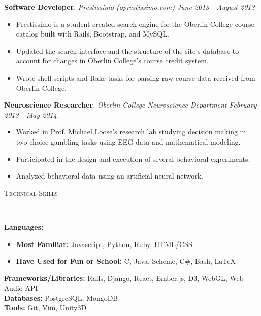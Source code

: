 \documentclass[9pt]{article}
\newenvironment{changemargin}[2]{%
  \begin{list}{}{%
    \setlength{\topsep}{0pt}%
    \setlength{\leftmargin}{#1}%
    \setlength{\rightmargin}{#2}%
    \setlength{\listparindent}{\parindent}%
    \setlength{\itemindent}{\parindent}%
    \setlength{\parsep}{\parskip}%
  }%
  \item[]}{\end{list}
}
\newcommand{\lineover}{
	\begin{changemargin}{-0.05in}{-0.05in}
		\vspace*{-8pt}
		\hrulefill \\
		\vspace*{-2pt}
	\end{changemargin}
}
\newcommand{\header}[1]{
	\begin{changemargin}{-0.5in}{-0.5in}
		\scshape{#1}\\
  	\lineover
	\end{changemargin}
}
\newenvironment{body} {
	\vspace*{-16pt}
	\begin{changemargin}{-0.25in}{-0.5in}
  }	
	{\end{changemargin}
}
\begin{document}
\begin{body}
	\textbf{Software Developer}, \emph{Prestissimo (oprestissimo.com)} \hfill \emph{June 2013 - August 2013}\\
	\vspace*{-4pt}
	\begin{itemize} \itemsep -0pt  %
		\item Prestissimo is a student-created search engine for the  Oberlin College course catalog built with Rails, Bootstrap, and MySQL.
		\item Updated the search interface and the structure of the site's database to account for changes in Oberlin College's course credit system.
		\item Wrote shell scripts and Rake tasks for parsing raw course data received from Oberlin College.
	\end{itemize}

	\textbf{Neuroscience Researcher}, \emph{Oberlin College Neuroscience Department} \hfill \emph{February 2013 - May 2014}\\
	\vspace*{-4pt}
	\begin{itemize} \itemsep -0pt  %
		\item Worked in Prof. Michael Loose's research lab studying decision making in two-choice gambling tasks using EEG data and mathematical modeling.
		\item Participated in the design and execution of several behavioral experiments.
		\item Analyzed behavioral data using an artificial neural network.
	\end{itemize}
\end{body}

\smallskip

\header{Technical Skills}

\begin{body}
	\vspace{14pt}
	\textbf{Languages:}{} 
		\begin{itemize} \itemsep -0pt  %
			\item \textbf{Most Familiar:} Javascript, Python, Ruby, HTML/CSS
			\item \textbf{Have Used for Fun or School:} C, Java, Scheme, C\#, Bash, \LaTeX \\
		\end{itemize}
	\smallskip
	\textbf{Frameworks/Libraries:}{} Rails, Django, React, Ember.js, D3, WebGL, Web Audio API \\
	\smallskip
	\textbf{Databases:}{} PostgreSQL, MongoDB \\
	\smallskip
	\textbf{Tools:}{} Git, Vim, Unity3D \\
\end{body}
\end{document}
